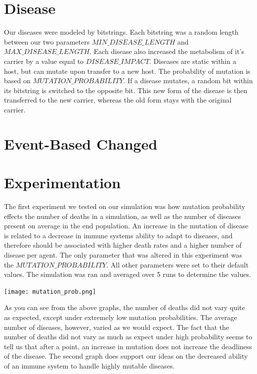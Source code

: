 \documentclass[12pt,a4paper]{article} %
\begin{document}
    \section{Disease}
    Our diseases were modeled by bitstrings. Each bitstring was a random length between our two parameters $MIN\_DISEASE\_LENGTH$ and $MAX\_DISEASE\_LENGTH$. Each disease also increased the metabolism of it's carrier by a value equal to $DISEASE\_IMPACT$. Diseases are static within a host, but can mutate upon transfer to a new host. The probability of mutation is based on $MUTATION\_PROBABILITY$. If a disease mutates, a random bit within its bitstring is switched to the opposite bit. This new form of the disease is then transferred to the new carrier, whereas the old form stays with the original carrier.
    
    \section{Event-Based Changed}
    
    \section{Experimentation}
    The first experiment we tested on our simulation was how mutation probability effects the number of deaths in a simulation, as well as the number of diseases present on average in the end population. An increase in the mutation of disease is related to a decrease in immune systems ability to adapt to diseases, and therefore should be associated with higher death rates and a higher number of disease per agent. The only parameter that was altered in this experiment was the $MUTATION\_PROBABILITY$. All other parameters were set to their default values. The simulation was ran and averaged over 5 runs to determine the values.
    
    \texttt{[image: mutation\_prob.png]}
    
    As you can see from the above graphs, the number of deaths did not vary quite as expected, except under extremely low mutation probabilities. The average number of diseases, however, varied as we would expect. The fact that the number of deaths did not vary as much as expect under high probability seems to tell us that after a point, an increase in mutation does not increase the deadliness of the disease. The second graph does support our ideas on the decreased ability of an immune system to handle highly mutable diseases.
    
\end{document}
